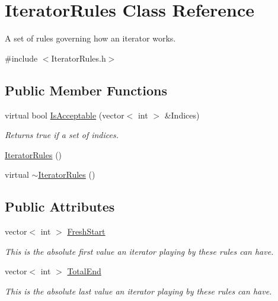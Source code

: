 \hypertarget{classJKBuilder_1_1IteratorRules}{
\section{IteratorRules Class Reference}
\label{classJKBuilder_1_1IteratorRules}
}


A set of rules governing how an iterator works.  


{\ttfamily \#include $<$IteratorRules.h$>$}\subsection*{Public Member Functions}
\begin{DoxyCompactItemize}
\item 
virtual bool \hyperlink{classJKBuilder_1_1IteratorRules_ae197a0b320460b5c5d42d58bc921ddbc}{IsAcceptable} (vector$<$ int $>$ \&Indices)
\begin{DoxyCompactList}\small\item\em Returns true if a set of indices. \item\end{DoxyCompactList}\item 
\hyperlink{classJKBuilder_1_1IteratorRules_ae657e753967d73a7b2966dccb364682b}{IteratorRules} ()
\item 
virtual \hyperlink{classJKBuilder_1_1IteratorRules_a59f6acedab9a2a18057b88a2c4d6df92}{$\sim$IteratorRules} ()
\end{DoxyCompactItemize}
\subsection*{Public Attributes}
\begin{DoxyCompactItemize}
\item 
vector$<$ int $>$ \hyperlink{classJKBuilder_1_1IteratorRules_a405a336c1e1fa1b3a7a3e906b07722bf}{FreshStart}
\begin{DoxyCompactList}\small\item\em This is the absolute first value an iterator playing by these rules can have. \item\end{DoxyCompactList}\item 
vector$<$ int $>$ \hyperlink{classJKBuilder_1_1IteratorRules_a1e9f42e2eb6c6f9752414b8e43a3b36a}{TotalEnd}
\begin{DoxyCompactList}\small\item\em This is the absolute last value an iterator playing by these rules can have. \item\end{DoxyCompactList}\end{DoxyCompactItemize}
